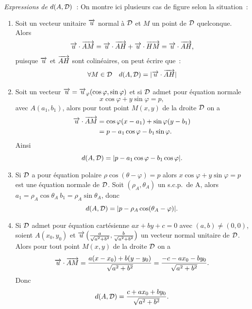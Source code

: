 \emph{Expressions de $d(A,\mathcal{D})$}~:
On montre ici plusieurs cas de figure selon la situation~:
\begin{enumerate}
\item Soit un vecteur unitaire $\overrightarrow{u}$ normal à $\mathcal{D}$ et $M$ un point de $\mathcal{D}$ quelconque. Alors
  \begin{equation}
    \overrightarrow{u} \cdot \overrightarrow{AM} = \overrightarrow{u} \cdot \overrightarrow{AH} + \overrightarrow{u} \cdot \overrightarrow{HM}=\overrightarrow{u} \cdot \overrightarrow{AH},
  \end{equation}
  puisque $\overrightarrow{u}$ et $\overrightarrow{AH}$ sont colinéaires, on peut écrire que~:
  \begin{equation}
    \forall M \in \mathcal{D} \quad d(A,\mathcal{D})=|\overrightarrow{u} \cdot \overrightarrow{AH}|
  \end{equation}
\item Soit un vecteur $\overrightarrow{u}=\overrightarrow{u}_\varphi(\cos \varphi, \sin \varphi)$ et si $\mathcal{D}$ admet pour équation normale
  \begin{equation}
    x \cos \varphi + y \sin \varphi=p,
  \end{equation}
  avec $A(a_1,b_1)$, alors pour tout point $M(x,y)$ de la droite $\mathcal{D}$ on a
  \begin{align}
    \overrightarrow{u} \cdot \overrightarrow{AM} &= \cos \varphi (x-a_1) + \sin \varphi (y-b_1)\\
    &= p-a_1\cos\varphi -b_1\sin\varphi.
  \end{align}
  Ainsi
  \begin{equation}
    d(A,\mathcal{D})=|p-a_1\cos\varphi-b_1\cos\varphi|.
  \end{equation}
\item Si $\mathcal{D}$ a pour équation polaire $\rho\cos(\theta-\varphi)=p$ alors $x \cos \varphi + y \sin \varphi=p$ est une équation normale de $\mathcal{D}$. Soit $(\rho_A,\theta_A)$ un s.c.p.\ de A, alors $a_1=\rho_A\cos\theta_A \ b_1=\rho_A\sin\theta_A$, donc
  \begin{equation}
    d(A,\mathcal{D})=|p-\rho_A\cos(\theta_A-\varphi)|.
  \end{equation}
\item Si $\mathcal{D}$ admet pour équation cartésienne $ax+by+c=0$ avec $(a,b) \neq (0,0)$, soient $A(x_0,y_0)$ et $\overrightarrow{u} \left(\frac{a}{\sqrt{a^2+b^2}}, \frac{b}{\sqrt{a^2+b^2}}\right)$ un vecteur normal unitaire de $\mathcal{D}$. Alors pour tout point $M(x,y)$ de la droite $\mathcal{D}$ on a
  \begin{equation}
      \overrightarrow{u}\cdot\overrightarrow{AM}=\frac{a(x-x_0)+b(y-y_0)}{\sqrt{a^2+b^2}}=\frac{-c-ax_0-by_0}{\sqrt{a^2+b^2}}.
    \end{equation}
    Donc
    \begin{equation}
      d(A,\mathcal{D})=\frac{c+ax_0+by_0}{\sqrt{a^2+b^2}}.
    \end{equation}
  \end{enumerate}
  
